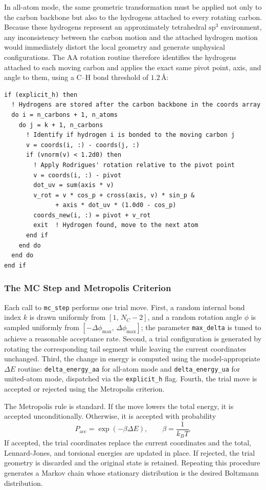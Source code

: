 In all-atom mode, the same geometric transformation must be applied not
only to the carbon backbone but also to the hydrogens attached to every
rotating carbon. Because these hydrogens represent an approximately
tetrahedral $\mathrm{sp}^3$ environment, any inconsistency between the
carbon motion and the attached hydrogen motion would immediately distort
the local geometry and generate unphysical configurations. The AA
rotation routine therefore identifies the hydrogens attached to each
moving carbon and applies the exact same pivot point, axis, and angle to
them, using a C--H bond threshold of $1.2\,\text{\AA}$:
 
\begin{lstlisting}
if (explicit_h) then
  ! Hydrogens are stored after the carbon backbone in the coords array
  do i = n_carbons + 1, n_atoms
    do j = k + 1, n_carbons
      ! Identify if hydrogen i is bonded to the moving carbon j
      v = coords(i, :) - coords(j, :)
      if (vnorm(v) < 1.2d0) then
        ! Apply Rodrigues' rotation relative to the pivot point
        v = coords(i, :) - pivot
        dot_uv = sum(axis * v)
        v_rot = v * cos_p + cross(axis, v) * sin_p &
              + axis * dot_uv * (1.0d0 - cos_p)
        coords_new(i, :) = pivot + v_rot
        exit  ! Hydrogen found, move to the next atom
      end if
    end do
  end do
end if
\end{lstlisting}

\subsubsection{The MC Step and Metropolis Criterion}

Each call to \texttt{mc\_step} performs one trial move. First, a random
internal bond index $k$ is drawn uniformly from $[1,\, N_C - 2]$, and a
random rotation angle $\phi$ is sampled uniformly from
$[-\Delta\phi_{\max},\, \Delta\phi_{\max}]$; the parameter
\texttt{max\_delta} is tuned to achieve a reasonable acceptance rate.
Second, a trial configuration is generated by rotating the corresponding
tail segment while leaving the current coordinates unchanged. Third, the
change in energy is computed using the model-appropriate $\Delta E$
routine: \texttt{delta\_energy\_aa} for all-atom mode and
\texttt{delta\_energy\_ua} for united-atom mode, dispatched via the
\texttt{explicit\_h} flag. Fourth, the trial move is accepted or
rejected using the Metropolis criterion.

The Metropolis rule is standard. If the move lowers the total energy, it
is accepted unconditionally. Otherwise, it is accepted with probability
\[
P_{\mathrm{acc}} = \exp(-\beta \Delta E),
\qquad
\beta = \frac{1}{k_B T}.
\]
If accepted, the trial coordinates replace the current coordinates and
the total, Lennard-Jones, and torsional energies are updated in place.
If rejected, the trial geometry is discarded and the original state is
retained. Repeating this procedure generates a Markov chain whose
stationary distribution is the desired Boltzmann distribution.
 
